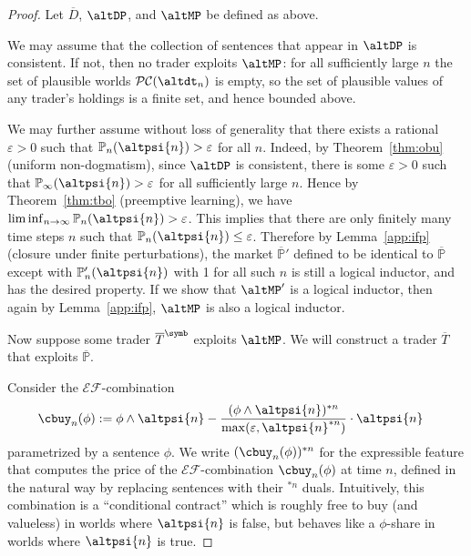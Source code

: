 \documentclass[authordate,onecolumn,noenvironments]{miri-tech-article}
\numberwithin{equation}{subsection}
\newcommand{\seq}[1]{{\overline{#1}}}
\newcommand{\nn}{n}
\newcommand{\li}{logical inductor}
\newcommand{\exfeatures}{\mathcal{E\!F}} %
\newcommand{\trade}{T}%
\newcommand{\Trader}{\seq{\trade}} %
\newcommand{\EF}{\exfeatures}
\newcommand{\BelState}{\mathbb{P}}
\newcommand{\pt}{\BelState}
\newcommand{\MP}{\seq{\pt}}
\newcommand{\dt}{D}
\newcommand{\DP}{\seq{\dt}}
\newcommand{\pcworlds}{\mathcal{P\-C}}
\begin{document}
\begin{proof}

Let $\DP$, $\altDP$, and $\altMP$ be defined as above.

We may assume that the collection of sentences that appear in $\altDP$ is consistent. If not, then no trader exploits $\altMP$: for all sufficiently large $n$ 
the set of plausible worlds $\pcworlds(\altdt_n)$ is empty, so the set of plausible values of any
trader's holdings is a finite set, and hence bounded above. 

We may further assume without loss of generality that there exists a rational $\varepsilon>0$ such that $\pt_\nn(\altpsi{n})>\varepsilon$ for all $\nn$. Indeed,
by Theorem~\ref{thm:obu} (uniform non-dogmatism), since $\altDP$ is consistent, there is some $\varepsilon>0$ such that $\pt_\infty(\altpsi{n})>\varepsilon$ for
all sufficiently large $n$. Hence by Theorem~\ref{thm:tbo} (preemptive learning), we have $\liminf_{n\to \infty} \pt_n (\altpsi{n}) > \varepsilon$. This implies that
there are only finitely many time steps $n$ such that $\pt_n (\altpsi{n}) \leq \varepsilon$. Therefore by Lemma~\ref{app:ifp} (closure under finite perturbations),
the market ${\MP'}$
defined to be identical to $\MP$ except with
$\pt'_n (\altpsi{n})$ with  1 for all such $n$ is still a \li{}, and has the desired property. If we show that ${\altMP}'$ is
a \li{},  then again by Lemma~\ref{app:ifp},  $\altMP$ is also a \li{}.

Now suppose some trader $\Trader^\symb$ exploits $\altMP$.  We will construct a trader $\Trader$ that exploits $\MP$.

Consider the $\EF$-combination
%
\begin{align*}
\cbuy_\nn(\phi) &:= \phi \wedge \altpsi{n} - \frac{(\phi \wedge \altpsi{n})^{* n} }{ \max(\varepsilon, \altpsi{n}^{* n})} \cdot \altpsi{n}  
\end{align*}
%
parametrized by a sentence $\phi$. 
We write $(\cbuy_\nn(\phi))^{* n}$ for the expressible feature that computes the price of the $\EF$-combination $\cbuy_n(\phi)$ at time $n$, defined in the natural way by replacing sentences
with their $^{* n}$ duals. Intuitively, this combination is a ``conditional contract'' which is roughly free to buy (and valueless) in worlds where $\altpsi{n}$ is false, but behaves like a $\phi$-share in worlds where $\altpsi{n}$ is true.  




\end{proof}
\end{document}
